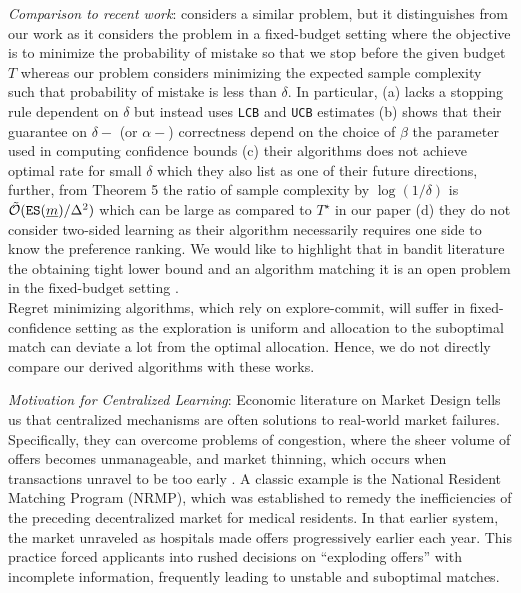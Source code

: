 \documentclass{article}
\begin{document}
\textit{Comparison to recent work}: \cite{hosseini2024putting} considers a similar problem, but it distinguishes from our work as it considers the problem in a fixed-budget setting where the objective is to minimize the probability of mistake so that we stop before the given budget $T$ whereas our problem considers minimizing the expected sample complexity such that probability of mistake is less than $\delta$.  In particular, \cite{hosseini2024putting} (a) lacks a stopping rule dependent on $\delta$ but instead uses \texttt{LCB} and \texttt{UCB} estimates (b) \cite[Section 4.2]{hosseini2024putting} shows that their guarantee on $\delta-$ (or $\alpha-$) correctness depend on the choice of $\beta$ the parameter used in computing confidence bounds (c) their algorithms does not achieve optimal rate for small $\delta$ which they also list as one of their future directions, further, from Theorem 5 the ratio of sample complexity by $\log(1/\delta)$ is $\Tilde{\mathcal{O}}(\texttt{ES}(\underline{m})/\Delta^2)$ which can be large as compared to $T^{\star}$ in our paper (d) they do not consider two-sided learning as their algorithm necessarily requires one side to know the preference ranking. We would like to highlight that in bandit literature the obtaining tight lower bound and an algorithm matching it is an open problem in the fixed-budget setting \cite{pmlr-v178-open-problem-qin22a}.\\
 Regret minimizing algorithms, which rely on explore-commit, will suffer in fixed-confidence setting as the exploration is uniform and allocation to the suboptimal match can deviate a lot from the optimal allocation. Hence, we do not directly compare our derived algorithms with these works. 

\textit{Motivation for Centralized Learning}:
Economic literature on Market Design tells us that centralized mechanisms are often solutions to real-world market failures. Specifically, they can overcome problems of congestion, where the sheer volume of offers becomes unmanageable, and market thinning, which occurs when transactions unravel to be too early  \cite{roth2015gets}. A classic example is the National Resident Matching Program (NRMP), which was established to remedy the inefficiencies of the preceding decentralized market for medical residents. In that earlier system, the market unraveled as hospitals made offers progressively earlier each year. This practice forced applicants into rushed decisions on ``exploding offers'' with incomplete information, frequently leading to unstable and suboptimal matches.
     
\end{document}
